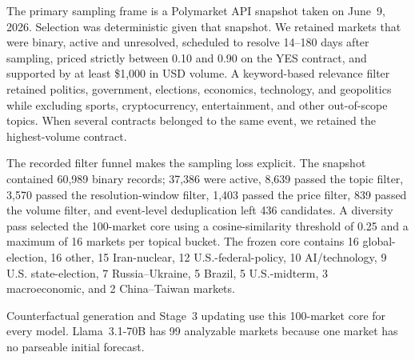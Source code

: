 The primary sampling frame is a Polymarket API snapshot taken on June~9, 2026.
Selection was deterministic given that snapshot.  We retained markets that were
binary, active and unresolved, scheduled to resolve 14--180 days after sampling,
priced strictly between 0.10 and 0.90 on the YES contract, and supported by at least
\$1,000 in USD volume.  A keyword-based relevance filter retained politics,
government, elections, economics, technology, and geopolitics while excluding
sports, cryptocurrency, entertainment, and other out-of-scope topics.  When several
contracts belonged to the same event, we retained the highest-volume contract.

The recorded filter funnel makes the sampling loss explicit.  The snapshot contained
60,989 binary records; 37,386 were active, 8,639 passed the topic filter, 3,570 passed
the resolution-window filter, 1,403 passed the price filter, 839 passed the volume
filter, and event-level deduplication left 436 candidates.  A diversity pass selected
the 100-market core using a cosine-similarity threshold of 0.25 and a maximum of
16 markets per topical bucket.  The frozen core contains 16 global-election,
16 other, 15 Iran-nuclear, 12 U.S.-federal-policy, 10 AI/technology, 9 U.S.
state-election, 7 Russia--Ukraine, 5 Brazil, 5 U.S.-midterm, 3 macroeconomic,
and 2 China--Taiwan markets.

Counterfactual generation and Stage~3 updating use this 100-market core for every
model. Llama~3.1-70B has 99 analyzable markets because one market has no parseable
initial forecast.

\begin{center}
\begin{minipage}{\linewidth}
\centering
{}
\label{tab:markets}
\footnotesize
{}
\end{minipage}
\end{center}

